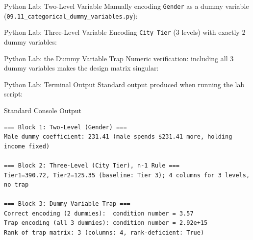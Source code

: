 \documentclass[10pt, aspectratio=169]{beamer}
\begin{document}
\begin{frame}[fragile]{Python Lab: Two-Level Variable}
  \scriptsize
  Manually encoding \texttt{Gender} as a dummy variable (\texttt{09.11\_categorical\_dummy\_variables.py}):
  {
  }
\end{frame}

\begin{frame}[fragile]{Python Lab: Three-Level Variable}
  \scriptsize
  Encoding \texttt{City Tier} (3 levels) with exactly 2 dummy variables:
  {
  }
\end{frame}

\begin{frame}[fragile]{Python Lab: the Dummy Variable Trap}
  \scriptsize
  Numeric verification: including all 3 dummy variables makes the design matrix singular:
  {
  }
\end{frame}

\begin{frame}[fragile]{Python Lab: Terminal Output}
  \scriptsize
  Standard output produced when running the lab script:
  \vspace{0.02cm}
  \begin{block}{Standard Console Output}
    \fontsize{3.2pt}{3.9pt}\selectfont
    \begin{verbatim}
=== Block 1: Two-Level (Gender) ===
Male dummy coefficient: 231.41 (male spends $231.41 more, holding income fixed)

=== Block 2: Three-Level (City Tier), n-1 Rule ===
Tier1=390.72, Tier2=125.35 (baseline: Tier 3); 4 columns for 3 levels, no trap

=== Block 3: Dummy Variable Trap ===
Correct encoding (2 dummies):  condition number = 3.57
Trap encoding (all 3 dummies): condition number = 2.92e+15
Rank of trap matrix: 3 (columns: 4, rank-deficient: True)
    \end{verbatim}
  \end{block}
\end{frame}
\end{document}
